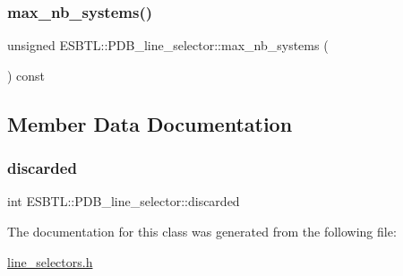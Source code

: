 \subsubsection{\texorpdfstring{max\+\_\+nb\+\_\+systems()}{max\_nb\_systems()}}
{\footnotesize\ttfamily unsigned E\+S\+B\+T\+L\+::\+P\+D\+B\+\_\+line\+\_\+selector\+::max\+\_\+nb\+\_\+systems (\begin{DoxyParamCaption}{ }\end{DoxyParamCaption}) const\hspace{0.3cm}{\ttfamily [inline]}}



\subsection{Member Data Documentation}
\mbox{\label{classESBTL_1_1PDB__line__selector_a8cd3267b5c5acf2c4ce708cd1fae5499}} 
\subsubsection{\texorpdfstring{discarded}{discarded}}
{\footnotesize\ttfamily int E\+S\+B\+T\+L\+::\+P\+D\+B\+\_\+line\+\_\+selector\+::discarded}



The documentation for this class was generated from the following file\+:\begin{DoxyCompactItemize}
\item 
\hyperlink{line__selectors_8h}{line\+\_\+selectors.\+h}\end{DoxyCompactItemize}
